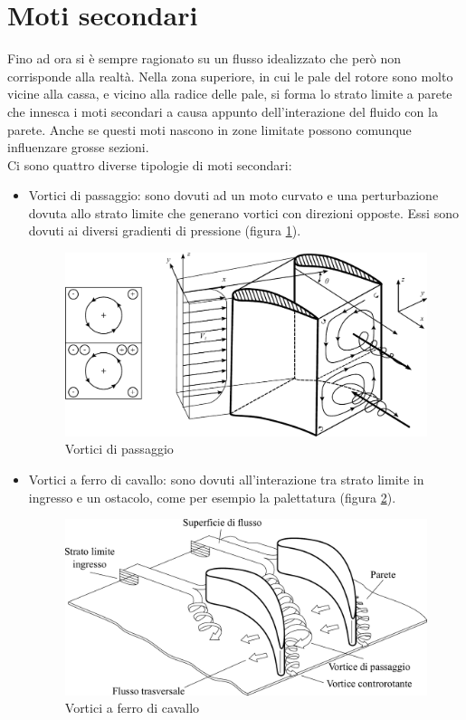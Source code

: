 \section{Moti secondari}
Fino ad ora si è sempre ragionato su un flusso idealizzato che però non corrisponde alla realtà. Nella zona superiore, in cui le pale del rotore sono molto vicine alla cassa, e vicino alla radice delle pale, si forma lo strato limite a parete che innesca i moti secondari a causa appunto dell'interazione del fluido con la parete. Anche se questi moti nascono in zone limitate possono comunque influenzare grosse sezioni.\\
Ci sono quattro diverse tipologie di moti secondari:
\begin{itemize}
\item Vortici di passaggio: sono dovuti ad un moto curvato e una perturbazione dovuta allo strato limite che generano vortici con direzioni opposte. Essi sono dovuti ai diversi gradienti di pressione (figura \ref{fig:VortPass}).
\begin{figure}[h!]
	\centering
	\includegraphics[width=.7\textwidth]{fig/VortPass.pdf}
	\caption{Vortici di passaggio}
	\label{fig:VortPass}
\end{figure}
\item Vortici a ferro di cavallo: sono dovuti all'interazione tra strato limite in ingresso e un ostacolo, come per esempio la palettatura (figura \ref{fd:VortFerrCav}).
\begin{figure}[h!]
	\centering
	\includegraphics[width=.7\textwidth]{fig/VortFerrCav.pdf}
	\caption{Vortici a ferro di cavallo}
	\label{fd:VortFerrCav}

\end{figure}
\end{itemize}
